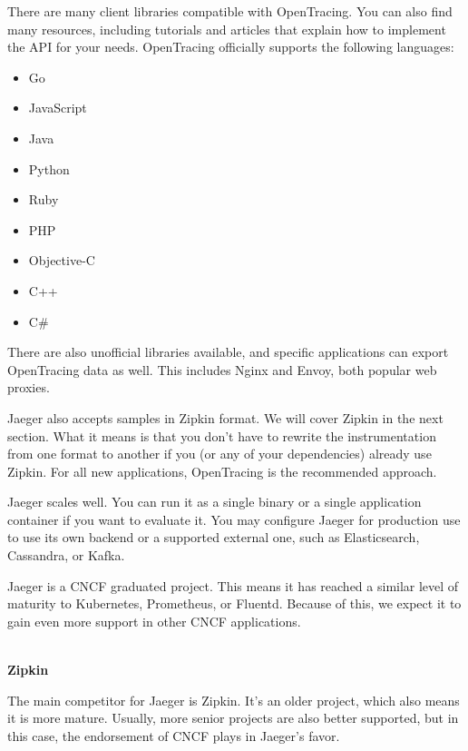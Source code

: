 There are many client libraries compatible with OpenTracing. You can also find many resources, including tutorials and articles that explain how to implement the API for your needs. OpenTracing officially supports the following languages:

\begin{itemize}
\item 
Go

\item 
JavaScript

\item 
Java

\item 
Python

\item 
Ruby

\item 
PHP

\item 
Objective-C

\item 
C++

\item 
C\#
\end{itemize}

There are also unofficial libraries available, and specific applications can export OpenTracing data as well. This includes Nginx and Envoy, both popular web proxies.

Jaeger also accepts samples in Zipkin format. We will cover Zipkin in the next section. What it means is that you don't have to rewrite the instrumentation from one format to another if you (or any of your dependencies) already use Zipkin. For all new applications, OpenTracing is the recommended approach.

Jaeger scales well. You can run it as a single binary or a single application container if you want to evaluate it. You may configure Jaeger for production use to use its own backend or a supported external one, such as Elasticsearch, Cassandra, or Kafka.

Jaeger is a CNCF graduated project. This means it has reached a similar level of maturity to Kubernetes, Prometheus, or Fluentd. Because of this, we expect it to gain even more support in other CNCF applications.

\hspace*{\fill} \\ %
\noindent
\textbf{Zipkin}

The main competitor for Jaeger is Zipkin. It's an older project, which also means it is more mature. Usually, more senior projects are also better supported, but in this case, the endorsement of CNCF plays in Jaeger's favor.

